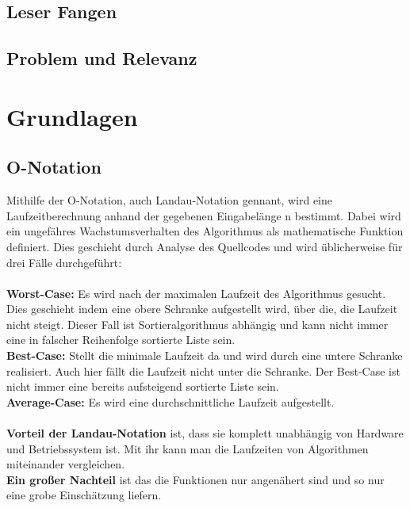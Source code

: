 \documentclass{article}
\begin{document}
\subsection{Leser Fangen}
\subsection{Problem und Relevanz}

\section{Grundlagen}
\subsection{O-Notation}
Mithilfe der O-Notation, auch Landau-Notation gennant, wird eine Laufzeitberechnung anhand der gegebenen Eingabelänge n bestimmt. Dabei wird ein ungefähres Wachstumsverhalten des Algorithmus als mathematische Funktion definiert. Dies geschieht durch Analyse des Quellcodes und wird üblicherweise für drei Fälle durchgeführt: \cite{monster2009buch,Rehn2006Sortieralgorithmen}\\ \\
\textbf {Worst-Case:} Es wird nach der maximalen Laufzeit des Algorithmus gesucht. Dies geschieht indem eine obere Schranke aufgestellt wird, über die, die Laufzeit nicht steigt. Dieser Fall ist Sortieralgorithmus abhängig und kann nicht immer eine in falscher Reihenfolge sortierte Liste sein.   \\
\textbf {Best-Case:} Stellt die minimale Laufzeit da und wird durch eine untere Schranke realisiert. Auch hier fällt die Laufzeit nicht unter die Schranke. Der Best-Case ist nicht immer eine bereits aufsteigend sortierte Liste sein.\\
\textbf {Average-Case:} Es wird eine durchschnittliche Laufzeit aufgestellt. \\ \\
\textbf{Vorteil der Landau-Notation} ist, dass sie komplett unabhängig von Hardware und Betriebssystem ist. Mit ihr kann man die Laufzeiten von Algorithmen miteinander vergleichen.\\
\textbf{Ein großer Nachteil} ist das die Funktionen nur angenähert sind und so nur eine grobe Einschätzung liefern.%
\end{document}
